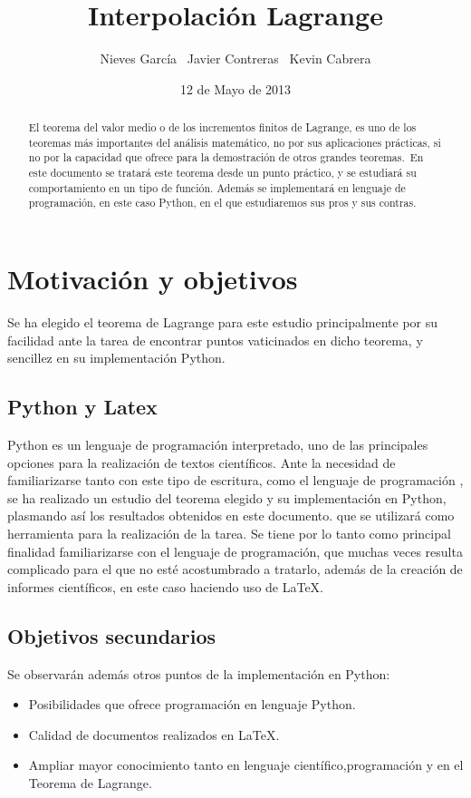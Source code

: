 \documentclass[14pt]{report}
\title{Interpolación Lagrange}
\author{Nieves García \ Javier Contreras \ Kevin Cabrera}
\date{12 de Mayo de 2013}
\begin{document}
\maketitle

\pagebreak
\pagebreak
\begin{abstract}
 El teorema del valor medio o de los incrementos finitos de Lagrange, es uno de los teoremas más importantes  
 del análisis matemático, no por sus aplicaciones prácticas, si no por la capacidad que ofrece para la
 demostración de otros grandes teoremas.\
 En este documento se tratará este teorema desde un punto práctico, y se estudiará su comportamiento en un tipo de función.
 Además se implementará en lenguaje de programación, en este caso Python, en el que estudiaremos sus pros y sus contras. 
\end{abstract}

\newpage
\tableofcontents
\pagebreak

\chapter{Motivación y objetivos}
Se ha elegido el teorema de Lagrange para este estudio principalmente por su facilidad ante la tarea de encontrar puntos vaticinados en dicho teorema,
y sencillez en su implementación Python.
\section{Python y Latex}
Python es un lenguaje de programación interpretado, uno de las principales opciones para la realización de textos científicos. Ante la necesidad de familiarizarse tanto 
con este tipo de escritura, como el lenguaje de programación , se ha realizado un estudio del teorema elegido y su implementación en Python, plasmando así los resultados obtenidos en este documento. 
que se utilizará como herramienta para la realización de la tarea.
Se tiene por lo tanto como principal finalidad familiarizarse con el lenguaje de programación, que muchas veces resulta complicado para el que no esté acostumbrado a tratarlo, además
de la creación de informes científicos, en este caso haciendo uso de \LaTeX.
\section{Objetivos secundarios}
Se observarán además otros puntos de la implementación en Python:
\begin{itemize}
\item Posibilidades que ofrece programación en lenguaje Python.
\item Calidad de documentos realizados en \LaTeX.
\item Ampliar mayor conocimiento tanto en lenguaje científico,programación y en el Teorema de Lagrange.
\end{itemize}
\pagebreak
\end{document}
